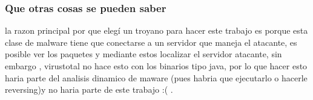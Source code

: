 \documentclass[10pt,a4paper]{article} %
\begin{document}
                    \subsubsection{Que otras cosas se pueden saber}
                        la razon principal por que elegí un troyano para hacer
                        este trabajo es porque esta clase de malware tiene que
                        conectarse a un servidor que maneja el atacante, es
                        posible ver los paquetes y mediante estos localizar el
                        servidor atacante, sin embargo , virustotal no hace
                        esto con los binarios tipo java, por lo que hacer esto
                        haria parte del analisis dinamico de maware (pues habria
                        que ejecutarlo o hacerle reversing)y no haria
                        parte de este trabajo :( .
                
           

    
    \nocite{*}
    
    
\end{document}
